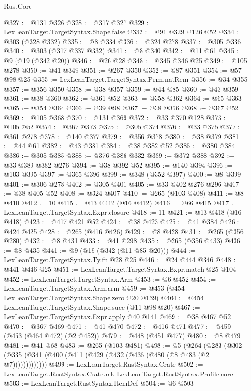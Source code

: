 \begin{lexlean}{RustCore}
\begin{coremodule}
@327 := @131 @326
@328 := @317 @327
@329 := LexLeanTarget.TargetSyntax.Shape.false
@332 := @91 @329 @126 @52
@334 := @303 (@328 @332)
@335 := @8 @334
@336 := @324 @278
@337 := @305 @336
@340 := @303 (@317 @337 @332)
@341 := @8 @340
@342 := @11 @61
@345 := @9 (@19 (@342 @20))
@346 := @26 @28
@348 := @345 @346 @25
@349 := @105 @278
@350 := @41 @349
@351 := @267 @350
@352 := @87 @351
@354 := @57 @98 @25
@355 := LexLeanTarget.TargetSyntax.Prim.natRem
@356 := @34 @355
@357 := @356 @350
@358 := @38 @357
@359 := @44 @85
@360 := @43 @359
@361 := @38 @360
@362 := @361 @52
@363 := @358 @362
@364 := @65 @363
@365 := @354 @364
@366 := @39 @98
@367 := @38 @366
@368 := @367 @52
@369 := @105 @368
@370 := @131 @369
@372 := @33 @370 @128
@373 := @105 @52
@374 := @367 @373
@375 := @305 @374
@376 := @33 @375
@377 := @361 @278
@378 := @140 @377
@379 := @356 @378
@380 := @38 @379
@381 := @44 @61
@382 := @43 @381
@384 := @38 @382 @52
@385 := @380 @384
@386 := @305 @385
@388 := @376 @386 @332
@389 := @372 @388
@392 := @33 @389 @382 @276
@394 := @38 @392 @52
@395 := @140 @394
@396 := @103 @395
@397 := @365 @396
@399 := @348 (@352 @397)
@400 := @8 @399
@401 := @306 @278
@402 := @305 @401
@405 := @33 @402 @276 @296
@407 := @38 @405 @52
@408 := @324 @407
@410 := @265 (@103 @408)
@411 := @8 @410
@412 := 10
@415 := @13 @412 (@16 @412)
@416 := @66 @415
@417 := LexLeanTarget.TargetSyntax.Expr.closure
@418 := 11
@421 := @13 @418 (@16 @418)
@423 := @417 @421 @52
@424 := @38 @423
@425 := @41 @384
@426 := @424 @425
@428 := @265 (@416 @426)
@429 := @8 @428
@431 := @265 (@356 @280)
@432 := @8 @431
@433 := @41 @298
@435 := @265 (@356 @433)
@436 := @8 @435
@441 := @9 (@19 (@342 (@11 @85 @20)))
@444 := LexLeanTarget.TargetSyntax.Ty.fn @28 @25
@446 := @24 @444 @346
@448 := @441 @446 @25
@451 := LexLeanTarget.TargetSyntax.Expr.match @25 @104
@452 := LexLeanTarget.TargetSyntax.Arm
@453 := @6 @452
@454 := LexLeanTarget.TargetSyntax.Arm.arm
@459 := @453 (@454 LexLeanTarget.TargetSyntax.Shape.zero @20 @139)
@464 := @454 LexLeanTarget.TargetSyntax.Shape.succ (@11 @98 @20)
@467 := LexLeanTarget.TargetSyntax.Expr.apply @40 @141
@469 := @38 @467 @52
@470 := @367 @469
@471 := @41 @470
@472 := @416 @471
@477 := @459 (@453 (@464 @472) (@2 @452))
@479 := @448 (@451 @477)
@480 := @8 @479
@481 := @41 @68
@483 := @265 (@103 @481)
@498 := @5
    (@264 (@283 (@302 (@335 (@341 (@400 (@411 (@429 (@432 (@436 (@480 (@8 @483 (@2 @7)))))))))))))
@499 := LexLeanTarget.RustSyntax.Crate
@502 := LexLeanTarget.RustSyntax.Crate.mk LexLeanTarget.RustSyntax.Profile.core
@503 := LexLeanTarget.RustSyntax.ItemDef
@504 := @6 @503

\end{coremodule}
\end{lexlean}
